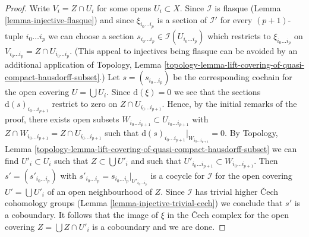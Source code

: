 \documentclass[10pt,a4paper]{amsart}
\theoremstyle{plain}
\theoremstyle{definition}
\theoremstyle{remark}
\numberwithin{equation}{subsection}
\begin{document}
\begin{proof}
\medskip\noindent
Write $V_i = Z \cap U_i$ for some opens $U_i \subset X$.
Since $\mathcal{I}$ is flasque (Lemma \ref{lemma-injective-flasque})
and since $\xi_{i_0 \ldots i_p}$ is a section of $\mathcal{I}'$
for every $(p + 1)$-tuple $i_0 \ldots i_p$ we can choose
a section $s_{i_0 \ldots i_p} \in \mathcal{I}(U_{i_0 \ldots i_p})$
which restricts to $\xi_{i_0 \ldots i_p}$ on
$V_{i_0 \ldots i_p} = Z \cap U_{i_0 \ldots i_p}$.
(This appeal to injectives being flasque can be avoided by an
additional application of
Topology, Lemma
\ref{topology-lemma-lift-covering-of-quasi-compact-hausdorff-subset}.)
Let $s = (s_{i_0 \ldots i_p})$ be the corresponding cochain
for the open covering $U = \bigcup U_i$.
Since $\text{d}(\xi) = 0$ we see that the sections
$\text{d}(s)_{i_0 \ldots i_{p + 1}}$ restrict to zero
on $Z \cap U_{i_0 \ldots i_{p + 1}}$. Hence, by the initial
remarks of the proof, there exists open subsets
$W_{i_0 \ldots i_{p + 1}} \subset U_{i_0 \ldots i_{p + 1}}$
with $Z \cap W_{i_0 \ldots i_{p + 1}} = Z \cap U_{i_0 \ldots i_{p + 1}}$
such that $\text{d}(s)_{i_0 \ldots i_{p + 1}}|_{W_{i_0 \ldots i_{p + 1}}} = 0$.
By Topology, Lemma
\ref{topology-lemma-lift-covering-of-quasi-compact-hausdorff-subset}
we can find $U'_i \subset U_i$ such that $Z \subset \bigcup U'_i$
and such that $U'_{i_0 \ldots i_{p + 1}} \subset W_{i_0 \ldots i_{p + 1}}$.
Then $s' = (s'_{i_0 \ldots i_p})$ with
$s'_{i_0 \ldots i_p} = s_{i_0 \ldots i_p}|_{U'_{i_0 \ldots i_p}}$
is a cocycle for $\mathcal{I}$ for the open covering
$U' = \bigcup U'_i$ of an open neighbourhood of $Z$.
Since $\mathcal{I}$ has trivial higher {\v C}ech cohomology groups
(Lemma \ref{lemma-injective-trivial-cech})
we conclude that $s'$ is a coboundary. It follows that the image of
$\xi$ in the {\v C}ech complex for the open covering
$Z = \bigcup Z \cap U'_i$ is a coboundary and we are done.
\end{proof}
\end{document}
